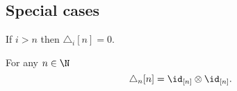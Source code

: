 \subsection{Special cases}


\begin{lemma}
	If $i > n$ then $\triangle_i [n] = 0$.
\end{lemma}


\begin{lemma} \label{lemma: triangle_n of n = n x n}
    For any $n \in \N$
    \[
    \triangle_n [n] = \id_{[n]} \otimes \id_{[n]}.
    \]
\end{lemma}

%

